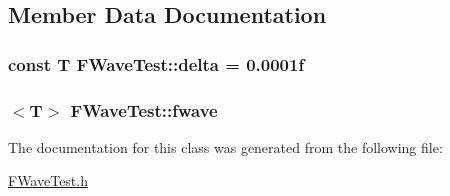 \subsection{Member Data Documentation}
\hypertarget{classFWaveTest_a8a0b6ebec0c270760dde9af243fc9045}{}
\subsubsection[{delta}]{\setlength{\rightskip}{0pt plus 5cm}const T F\+Wave\+Test\+::delta = 0.\+0001f\hspace{0.3cm}{\ttfamily [static]}}\label{classFWaveTest_a8a0b6ebec0c270760dde9af243fc9045}
\hypertarget{classFWaveTest_a195e044738f434127bedf96c2153f230}{}
\subsubsection[{fwave}]{$<$T$>$ F\+Wave\+Test\+::fwave}\label{classFWaveTest_a195e044738f434127bedf96c2153f230}


The documentation for this class was generated from the following file\+:\begin{DoxyCompactItemize}
\item 
\hyperlink{FWaveTest_8h}{F\+Wave\+Test.\+h}\end{DoxyCompactItemize}
